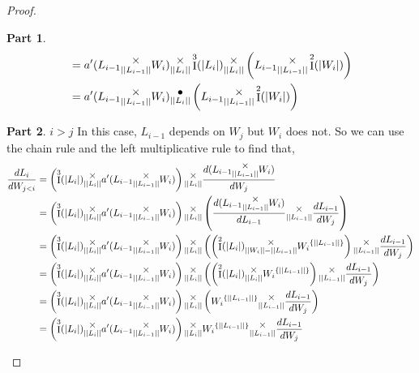\documentclass[12pt]{book}
\theoremstyle{plain}
\theoremstyle{definition}
\theoremstyle{ppart}
\newtheorem{ppart}{Part}
\theoremstyle{case}
\theoremstyle{solution}
\DeclareMathOperator{\Ident}{I}
\newcommand{\mmult}[1]{\text{\raisebox{1ex}{$\underset{#1}{\times}$}}}
\newcommand{\dmult}[1]{\text{\raisebox{1ex}{$\underset{#1}{\,\bullet\,}$}}}
\newcommand{\shape}[1]{\left|#1\right|}
\newcommand{\transpose}[2]{{#1}^{\{#2\}}}
\begin{document}
\begin{landscape}
\begin{proof}
\begin{ppart}
\begin{align*}
  &=
    a'(L_{i-1} \mmult{\shape{\shape{L_{i-1}}}} W_i) \mmult{\shape{\shape{L_i}}} \Ident^3(\shape{L_i})
    \mmult{\shape{\shape{L_i}}}
    \left(L_{i-1} \mmult{\shape{\shape{L_{i-1}}}} \Ident^2(\shape{W_i})\right) \\
  &=
    a'(L_{i-1} \mmult{\shape{\shape{L_{i-1}}}} W_i) \dmult{\shape{\shape{L_i}}}
    \left(L_{i-1} \mmult{\shape{\shape{L_{i-1}}}} \Ident^2(\shape{W_i})\right)
\end{align*}
\end{ppart}
\begin{ppart} $i > j$
In this case, $L_{i-1}$ depends on $W_j$ but $W_i$ does not. So we can use the chain rule and the
left multiplicative rule to find that,
\begin{align*}
  \frac{dL_i}{dW_{j<i}}
  &=
    \left(\Ident^3(\shape{L_i}) \mmult{\shape{\shape{L_i}}} a'(L_{i-1} \mmult{\shape{\shape{L_{i-1}}}} W_i) \right) 
    \mmult{\shape{\shape{L_i}}}
    \frac{d (L_{i-1} \mmult{\shape{\shape{L_{i-1}}}} W_i)}{dW_j} \\
  &=
    \left(\Ident^3(\shape{L_i}) \mmult{\shape{\shape{L_i}}} a'(L_{i-1} \mmult{\shape{\shape{L_{i-1}}}} W_i) \right) 
    \mmult{\shape{\shape{L_i}}}
    \left(
      \frac{d (L_{i-1} \mmult{\shape{\shape{L_{i-1}}}} W_i)}{dL_{i-1}}
      \mmult{\shape{\shape{L_{i-1}}}}
      \frac{dL_{i-1}}{dW_j}
    \right) \\
  &=
    \left(\Ident^3(\shape{L_i}) \mmult{\shape{\shape{L_i}}} a'(L_{i-1} \mmult{\shape{\shape{L_{i-1}}}} W_i) \right) 
    \mmult{\shape{\shape{L_i}}}
    \left(
      \left(
        \Ident^2(\shape{L_{i}})
        \mmult{\shape{\shape{W_i}}-\shape{\shape{L_{i-1}}}}
        \transpose{W_i}{\shape{\shape{L_{i-1}}}}
      \right)
      \mmult{\shape{\shape{L_{i-1}}}}
      \frac{d L_{i-1}}{dW_j}
    \right) \\
  &=
    \left(\Ident^3(\shape{L_i}) \mmult{\shape{\shape{L_i}}} a'(L_{i-1} \mmult{\shape{\shape{L_{i-1}}}} W_i) \right) 
    \mmult{\shape{\shape{L_i}}}
    \left(
      \left(
        \Ident^2(\shape{L_{i}})
        \mmult{\shape{\shape{L_i}}}
        \transpose{W_i}{\shape{\shape{L_{i-1}}}}
      \right)
      \mmult{\shape{\shape{L_{i-1}}}}
      \frac{d L_{i-1}}{dW_j}
    \right) \\
  &=
    \left(\Ident^3(\shape{L_i}) \mmult{\shape{\shape{L_i}}} a'(L_{i-1} \mmult{\shape{\shape{L_{i-1}}}} W_i) \right) 
    \mmult{\shape{\shape{L_i}}}
    \left(
      \transpose{W_i}{\shape{\shape{L_{i-1}}}}
      \mmult{\shape{\shape{L_{i-1}}}}
      \frac{d L_{i-1}}{dW_j}
    \right) \\
  &=
    \left(\Ident^3(\shape{L_i}) \mmult{\shape{\shape{L_i}}} a'(L_{i-1} \mmult{\shape{\shape{L_{i-1}}}} W_i) \right) 
    \mmult{\shape{\shape{L_i}}}
    \transpose{W_i}{\shape{\shape{L_{i-1}}}}
    \mmult{\shape{\shape{L_{i-1}}}}
    \frac{d L_{i-1}}{dW_j}
\end{align*}
\end{ppart}
\end{proof}
\end{landscape}
\end{document}
